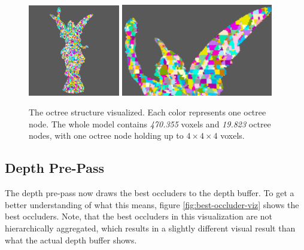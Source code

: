 \begin{figure}[h]
    \centering
    \includegraphics[width=151.5px]{images/graphics/lucy-voxel-octree-viz.jpg}
    \includegraphics[width=250px]{images/graphics/lucy-voxel-octree-viz-2.jpg}
    \caption{The octree structure visualized. Each color represents one octree node. The whole model contains 
    \emph{470.355} voxels and \emph{19.823} octree nodes, with one octree node holding up to \begin{math} 4 \times 4 \times 4 \end{math}
    voxels.}
    \label{fig:voxel-octree-viz}
\end{figure}

\subsection*{Depth Pre-Pass}

The depth pre-pass now draws the best occluders to the depth buffer. To get a better understanding of what this 
means, figure \ref{fig:best-occluder-viz} shows the best occluders. Note, that the best occluders in this 
visualization are not hierarchically aggregated, which results in a slightly different visual result than what 
the actual depth buffer shows. 


